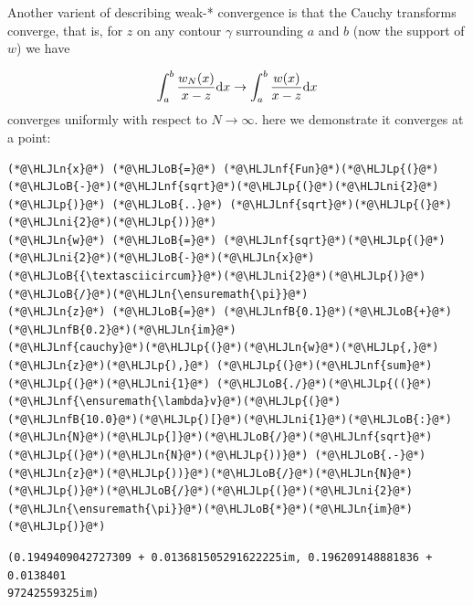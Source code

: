 \documentclass[12pt,a4paper]{article}
\newcommand{\HLJLn}[1]{#1}
\newcommand{\HLJLnf}[1]{\textcolor[RGB]{66,102,213}{#1}}
\newcommand{\HLJLnfB}[1]{\textcolor[RGB]{59,151,46}{#1}}
\newcommand{\HLJLni}[1]{\textcolor[RGB]{59,151,46}{#1}}
\newcommand{\HLJLoB}[1]{\textcolor[RGB]{102,102,102}{\textbf{#1}}}
\newcommand{\HLJLp}[1]{#1}
\def\D{ {\rm d} }
\def\dx{\D x}
\begin{document}
Another varient of describing weak-* convergence is that the Cauchy transforms converge,  that is, for $z$ on any  contour $\gamma$ surrounding $a$ and $b$ (now the support of $w$) we have

\[
\int_a^b {w_N(x) \over x - z} \dx \rightarrow \int_a^b {w(x) \over x - z} \dx
\]
converges uniformly with respect to $N \rightarrow \infty$. here we demonstrate it converges at a point:


\begin{lstlisting}
(*@\HLJLn{x}@*) (*@\HLJLoB{=}@*) (*@\HLJLnf{Fun}@*)(*@\HLJLp{(}@*)(*@\HLJLoB{-}@*)(*@\HLJLnf{sqrt}@*)(*@\HLJLp{(}@*)(*@\HLJLni{2}@*)(*@\HLJLp{)}@*) (*@\HLJLoB{..}@*) (*@\HLJLnf{sqrt}@*)(*@\HLJLp{(}@*)(*@\HLJLni{2}@*)(*@\HLJLp{))}@*)
(*@\HLJLn{w}@*) (*@\HLJLoB{=}@*) (*@\HLJLnf{sqrt}@*)(*@\HLJLp{(}@*)(*@\HLJLni{2}@*)(*@\HLJLoB{-}@*)(*@\HLJLn{x}@*)(*@\HLJLoB{{\textasciicircum}}@*)(*@\HLJLni{2}@*)(*@\HLJLp{)}@*)(*@\HLJLoB{/}@*)(*@\HLJLn{\ensuremath{\pi}}@*)
(*@\HLJLn{z}@*) (*@\HLJLoB{=}@*) (*@\HLJLnfB{0.1}@*)(*@\HLJLoB{+}@*)(*@\HLJLnfB{0.2}@*)(*@\HLJLn{im}@*)
(*@\HLJLnf{cauchy}@*)(*@\HLJLp{(}@*)(*@\HLJLn{w}@*)(*@\HLJLp{,}@*) (*@\HLJLn{z}@*)(*@\HLJLp{),}@*) (*@\HLJLp{(}@*)(*@\HLJLnf{sum}@*)(*@\HLJLp{(}@*)(*@\HLJLni{1}@*) (*@\HLJLoB{./}@*)(*@\HLJLp{((}@*)(*@\HLJLnf{\ensuremath{\lambda}v}@*)(*@\HLJLp{(}@*)(*@\HLJLnfB{10.0}@*)(*@\HLJLp{)[}@*)(*@\HLJLni{1}@*)(*@\HLJLoB{:}@*)(*@\HLJLn{N}@*)(*@\HLJLp{]}@*)(*@\HLJLoB{/}@*)(*@\HLJLnf{sqrt}@*)(*@\HLJLp{(}@*)(*@\HLJLn{N}@*)(*@\HLJLp{))}@*) (*@\HLJLoB{.-}@*) (*@\HLJLn{z}@*)(*@\HLJLp{))}@*)(*@\HLJLoB{/}@*)(*@\HLJLn{N}@*)(*@\HLJLp{)}@*)(*@\HLJLoB{/}@*)(*@\HLJLp{(}@*)(*@\HLJLni{2}@*)(*@\HLJLn{\ensuremath{\pi}}@*)(*@\HLJLoB{*}@*)(*@\HLJLn{im}@*)(*@\HLJLp{)}@*)
\end{lstlisting}

\begin{lstlisting}
(0.1949409042727309 + 0.013681505291622225im, 0.196209148881836 + 0.0138401
97242559325im)
\end{lstlisting}
\end{document}
